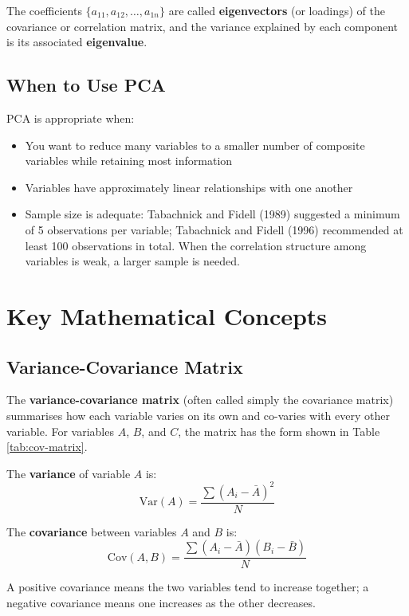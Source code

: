 \documentclass[
]{book}
\providecommand{\tightlist}{%
  \setlength{\itemsep}{0pt}\setlength{\parskip}{0pt}}
\begin{document}
The coefficients \(\{a_{11}, a_{12}, \ldots, a_{1n}\}\) are called \textbf{eigenvectors} (or loadings) of the covariance or correlation matrix, and the variance explained by each component is its associated \textbf{eigenvalue}.

\subsection{When to Use PCA}\label{when-to-use-pca}

PCA is appropriate when:

\begin{itemize}
\tightlist
\item
  You want to reduce many variables to a smaller number of composite variables while retaining most information
\item
  Variables have approximately linear relationships with one another
\item
  Sample size is adequate: Tabachnick and Fidell (1989) suggested a minimum of 5 observations per variable; Tabachnick and Fidell (1996) recommended at least 100 observations in total. When the correlation structure among variables is weak, a larger sample is needed.
\end{itemize}

\section{Key Mathematical Concepts}\label{key-mathematical-concepts}

\subsection{Variance-Covariance Matrix}\label{variance-covariance-matrix}

The \textbf{variance-covariance matrix} (often called simply the covariance matrix) summarises how each variable varies on its own and co-varies with every other variable. For variables \(A\), \(B\), and \(C\), the matrix has the form shown in Table \ref{tab:cov-matrix}.

The \textbf{variance} of variable \(A\) is:
\[\text{Var}(A) = \frac{\sum (A_i - \bar{A})^2}{N}\]

The \textbf{covariance} between variables \(A\) and \(B\) is:
\[\text{Cov}(A, B) = \frac{\sum (A_i - \bar{A})(B_i - \bar{B})}{N}\]

A positive covariance means the two variables tend to increase together; a negative covariance means one increases as the other decreases.
\end{document}
